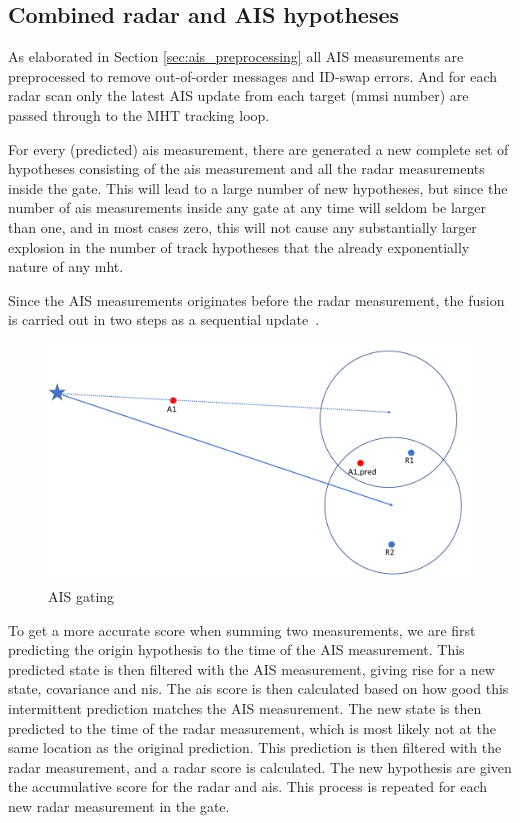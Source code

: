 \subsection{Combined radar and AIS hypotheses}\label{subsec:combined_radar_and_ais_hypotheses}
As elaborated in Section \ref{sec:ais_preprocessing} all AIS measurements are preprocessed to remove out-of-order messages and ID-swap errors. And for each radar scan only the latest AIS update from each target (\gls{mmsi} number) are passed through to the MHT tracking loop.

For every (predicted) \gls{ais} measurement, there are generated a new complete set of hypotheses consisting of the \gls{ais} measurement and all the radar measurements inside the gate. This will lead to a large number of new hypotheses, but since the number of \gls{ais} measurements inside any gate at any time will seldom be larger than one, and in most cases zero, this will not cause any substantially larger explosion in the number of track hypotheses that the already exponentially nature of any \gls{mht}.%

Since the AIS measurements originates before the radar measurement, the fusion is carried out in two steps as a sequential update~\cite{Bar-Shalom1995}. 
\begin{figure}[H]
\centering
\includegraphics[width = .8\textwidth]{Figures/AIS_gating.pdf}
\caption{AIS gating}
\label{fig:ais_gating}
\end{figure}
To get a more accurate score when summing two measurements, we are first predicting the origin hypothesis to the time of the AIS measurement. This predicted state is then filtered with the AIS measurement, giving rise for a new state, covariance and \gls{nis}. The \gls{ais} score is then calculated based on how good this intermittent prediction matches the AIS measurement. The new state is then predicted to the time of the radar measurement, which is most likely not at the same location as the original prediction. This prediction is then filtered with the radar measurement, and a radar score is calculated. The new hypothesis are given the accumulative score for the radar and \gls{ais}. This process is repeated for each new radar measurement in the gate.

